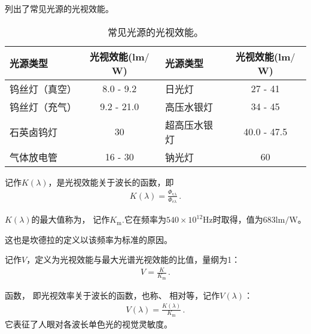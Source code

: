 列出了常见光源的光视效能。
\begin{table}[htbp]
      \centering
      \begin{tabular}{lc|lc}
            \toprule
            \textbf{光源类型} & \textbf{光视效能(lm$/$W)} & \textbf{光源类型} & \textbf{光视效能(lm$/$W)} \\
            \midrule
            钨丝灯（真空）    & 8.0 - 9.2                 & 日光灯            & 27 - 41                   \\
            钨丝灯（充气）    & 9.2 - 21.0                & 高压水银灯        & 34 - 45                   \\
            石英卤钨灯        & 30                        & 超高压水银灯      & 40.0 - 47.5               \\
            气体放电管        & 16 - 30                   & 钠光灯            & 60                        \\
            \bottomrule
      \end{tabular}
      \caption{常见光源的光视效能。}
      \label{tab:5.ex01}
\end{table}

\begin{definition}
      记作$K(\lambda)$，是光视效能关于波长的函数，即
      \begin{align}
            K(\lambda)=\frac{\varPhi_{\mathrm{v}\lambda}}{\varPhi_{\mathrm{e}\lambda}}\, .
      \end{align}
\end{definition}

\begin{definition}
      $K(\lambda)$的最大值称为，
      记作$K_{\mathrm{m}}$.它在频率为$540\times10^{12}\text{Hz}$时取得，值为683lm$/$W。
\end{definition}
这也是坎德拉的定义以该频率为标准的原因。

\begin{definition}
      记作$V$，定义为光视效能与最大光谱光视效能的比值，量纲为1：
      \begin{align}
            V=\frac{K}{K_{\mathrm{m}}}\, .
      \end{align}
\end{definition}

\begin{definition}
      函数，
      即光视效率关于波长的函数，也称、
      相对等，记作$V(\lambda)$：
      \begin{align}
            V(\lambda)=\frac{K(\lambda)}{K_{\mathrm{m}}}\, .
      \end{align}
      它表征了人眼对各波长单色光的视觉灵敏度。
\end{definition}

